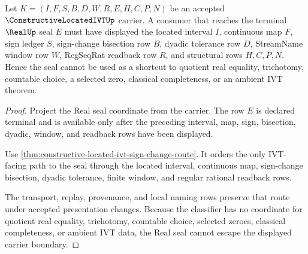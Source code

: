\begin{theorem}
\label{thm:constructive-located-ivt-real-seal-nonescape}
Let $K=(I,F,S,B,D,W,R,E,H,C,P,N)$ be an accepted $\ConstructiveLocatedIVTUp$ carrier. A consumer that reaches the terminal $\RealUp$ seal $E$ must have displayed the located interval $I$, continuous map $F$, sign ledger $S$, sign-change bisection row $B$, dyadic tolerance row $D$, StreamName window row $W$, RegSeqRat readback row $R$, and structural rows $H,C,P,N$. Hence the seal cannot be used as a shortcut to quotient real equality, trichotomy, countable choice, a selected zero, classical completeness, or an ambient IVT theorem.
\end{theorem}
\begin{proof}
Project the Real seal coordinate from the carrier. The row $E$ is declared terminal and is available only after the preceding interval, map, sign, bisection, dyadic, window, and readback rows have been displayed.

Use \autoref{thm:constructive-located-ivt-sign-change-route}. It orders the only IVT-facing path to the seal through the located interval, continuous map, sign-change bisection, dyadic tolerance, finite window, and regular rational readback rows.

The transport, replay, provenance, and local naming rows preserve that route under accepted presentation changes. Because the classifier has no coordinate for quotient real equality, trichotomy, countable choice, selected zeroes, classical completeness, or ambient IVT data, the Real seal cannot escape the displayed carrier boundary.
\end{proof}




